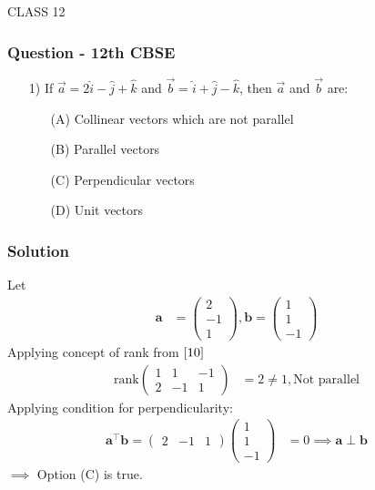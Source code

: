 \documentclass{beamer}
\begin{document}
\begin{frame}[standout]
    CLASS 12
\end{frame}








\begin{frame}
\frametitle{Question - 12th CBSE}
\begin{enumerate}
    \item [1)]
If $\overrightarrow{a} = 2\hat{i} - \hat{j} + \hat{k}$ and  $\overrightarrow{b} = \hat{i} + \hat{j} - \hat{k}$, then $\overrightarrow{a}$ and $\overrightarrow{b}$ are:
    \begin{enumerate}
\item [(A)] Collinear vectors which are not parallel
\item [(B)] Parallel vectors
\item [(C)] Perpendicular vectors
\item [(D)] Unit vectors
\end{enumerate}
\end{enumerate}
    
\end{frame}





\begin{frame}
\frametitle{Solution}
Let
\begin{align}
    \textbf{a} &= \begin{pmatrix}
        2\\
        -1\\
        1
    \end{pmatrix} , 
    \textbf{b}=\begin{pmatrix}
        1\\
        1\\
        -1
    \end{pmatrix}
    \end{align}
    Applying concept of rank from $\eqref{10}$
    \begin{align}
                  \text{rank}\begin{pmatrix}
        1 & 1 & -1\\
        2 & -1 & 1
    \end{pmatrix} &=2 \neq 1 ,
    \text{Not parallel}
    \end{align}
    Applying condition for perpendicularity:
    \begin{align}
            \textbf{a}^{\top}\textbf{b} = \begin{pmatrix}
        2 &-1 &1
    \end{pmatrix}\begin{pmatrix}
        1\\
        1\\
        -1
    \end{pmatrix} &= 0
    \implies \textbf{a} \perp \textbf{b}
\end{align}
$\implies$ Option (C) is true.
    
\end{frame}
\end{document}
